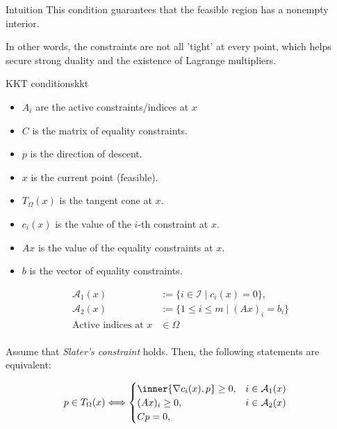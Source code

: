 \begin{remark}{Intuition}{}
	This condition guarantees that the feasible region has a nonempty interior.

	In other words, the constraints are not all 'tight' at every point, which helps secure strong duality and the existence of Lagrange multipliers.
\end{remark}

\begin{theorem}{KKT conditions}{kkt}

	\medskip

	\begin{itemize}
		\item \(A_i\) are the active constraints/indices at \(x\)
		\item \(C\) is the matrix of equality constraints.
		\item \(p\) is the direction of descent.
		\item \(x\) is the current point (feasible).
		\item \(T_{\Omega}(x)\) is the tangent cone at \(x\).
		\item \(c_i(x)\) is the value of the \(i\)-th constraint at \(x\).
		\item \(Ax\) is the value of the equality constraints at \(x\).
		\item \(b\) is the vector of equality constraints.
	\end{itemize}
	\begin{align*}
		\mathcal{A}_1(x)            & := \{i \in \mathcal{I} \mid c_i(x) = 0\},                     \\
		\mathcal{A}_2(x)            & := \{1 \leq i \leq m \mid (Ax)_i = b_i\} \tag{Active indices} \\
		\text{Active indices at } x & \in \Omega                                                    \\
	\end{align*}

	Assume that \emph{Slater's constraint} holds. Then, the following statements are equivalent:

	\begin{align*}
		p\in T_{\Omega}(x) & \Longleftrightarrow
		\begin{cases}
			\inner{\nabla c_i(x), p} \geq 0, & i \in \mathcal{A}_1(x) \\
			(Ax)_i \geq 0,                   & i \in \mathcal{A}_2(x) \\
			Cp = 0,                          &                        \\
		\end{cases}
	\end{align*}

\end{theorem}


